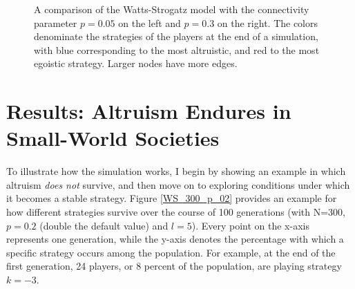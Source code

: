 \documentclass{JASSS}
\begin{document}
\begin{figure}%
	\centering
	\qquad
	\caption{A comparison of the Watts-Strogatz model with  the connectivity parameter $p=0.05$ on the left and $p=0.3$ on the right. The colors denominate the strategies of the players at the end of a simulation, with blue corresponding to the most altruistic, and red to the most egoistic strategy. Larger nodes have more edges.}%
	\label{WS_300_illustrate_p}%
\end{figure}

\section*{Results: Altruism Endures in Small-World Societies}
To illustrate how the simulation works, I begin by showing an example in which altruism \textit{does not} survive, and then move on to exploring conditions under which it becomes a stable strategy. Figure \ref{WS_300_p_02} provides an example for how different strategies survive over the course of 100 generations (with N=300, $p=0.2$ (double the default value) and $l=5$). Every point on the x-axis represents one generation, while the y-axis denotes the percentage with which a specific strategy occurs among the population. For example, at the end of the first generation, 24 players, or 8 percent of the population, are playing strategy $k=-3$.
\end{document}
